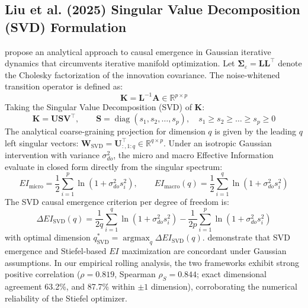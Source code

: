 \documentclass[12pt]{article}
\begin{document}
\subsection{Liu et al. (2025) Singular Value Decomposition (SVD) Formulation}
\citet{liu2025singular} propose an analytical approach to causal emergence in Gaussian iterative dynamics that circumvents iterative manifold optimization. Let $\boldsymbol{\Sigma}_\varepsilon = \mathbf{L}\mathbf{L}^\top$ denote the Cholesky factorization of the innovation covariance. The noise-whitened transition operator is defined as:
\begin{equation}
\mathbf{K} = \mathbf{L}^{-1}\mathbf{A} \in \mathbb{R}^{p \times p}
\end{equation}
Taking the Singular Value Decomposition (SVD) of $\mathbf{K}$:
\begin{equation}
\mathbf{K} = \mathbf{U} \mathbf{S} \mathbf{V}^\top, \qquad \mathbf{S} = \operatorname{diag}(s_1, s_2, \dots, s_p), \quad s_1 \ge s_2 \ge \dots \ge s_p \ge 0
\end{equation}
The analytical coarse-graining projection for dimension $q$ is given by the leading $q$ left singular vectors: $\mathbf{W}_{\text{SVD}} = \mathbf{U}_{:, 1:q}^\top \in \mathbb{R}^{q \times p}$. Under an isotropic Gaussian intervention with variance $\sigma_{do}^2$, the micro and macro Effective Information evaluate in closed form directly from the singular spectrum:
\begin{equation}
EI_{\text{micro}} = \frac{1}{2}\sum_{i=1}^p \ln\left(1 + \sigma_{do}^2 s_i^2\right), \qquad EI_{\text{macro}}(q) = \frac{1}{2}\sum_{i=1}^q \ln\left(1 + \sigma_{do}^2 s_i^2\right)
\end{equation}
The SVD causal emergence criterion per degree of freedom is:
\begin{equation}
\Delta EI_{\text{SVD}}(q) = \frac{1}{2q}\sum_{i=1}^q \ln\left(1 + \sigma_{do}^2 s_i^2\right) - \frac{1}{2p}\sum_{i=1}^p \ln\left(1 + \sigma_{do}^2 s_i^2\right)
\end{equation}
with optimal dimension $q_{\text{SVD}}^* = \operatorname{argmax}_{q} \Delta EI_{\text{SVD}}(q)$. \citet{liu2025singular} demonstrate that SVD emergence and Stiefel-based $EI$ maximization are concordant under Gaussian assumptions. In our empirical rolling analysis, the two frameworks exhibit strong positive correlation ($\rho = 0.819$, Spearman $\rho_S = 0.844$; exact dimensional agreement 63.2\%, and 87.7\% within $\pm 1$ dimension), corroborating the numerical reliability of the Stiefel optimizer.
\end{document}
